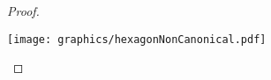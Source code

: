 \begin{proof}
\begin{minipage}{\linewidth}
\begin{center}
\texttt{[image: graphics/hexagonNonCanonical.pdf]}
\label{fig:hexagonNonCanonical.pdf}
\end{center}
\end{minipage}







\end{proof}
